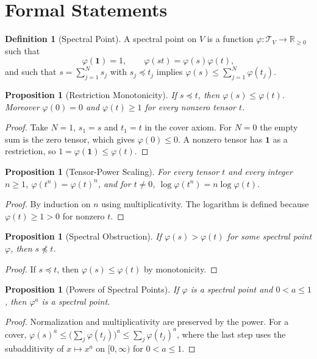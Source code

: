 \documentclass[11pt,letterpaper]{report}
\theoremstyle{plain}
\newtheorem{proposition}[theorem]{Proposition}
\theoremstyle{definition}
\newtheorem{definition}[theorem]{Definition}
\theoremstyle{remark}
\begin{document}
\section{Formal Statements}

\begin{definition}[Spectral Point]
A spectral point on $V$ is a function $\varphi:\mathcal T_V\to\mathbb R_{\ge0}$ such that
\[
\varphi(\mathbf 1)=1,\qquad\varphi(st)=\varphi(s)\varphi(t),
\]
and such that $s=\sum_{j=1}^{N}s_j$ with $s_j\preceq t_j$ implies $\varphi(s)\le\sum_{j=1}^{N}\varphi(t_j)$.
\end{definition}

\begin{proposition}[Restriction Monotonicity]
If $s\preceq t$, then $\varphi(s)\le\varphi(t)$. Moreover $\varphi(0)=0$ and $\varphi(t)\ge1$ for every nonzero tensor $t$.
\end{proposition}
\begin{proof}
Take $N=1$, $s_1=s$ and $t_1=t$ in the cover axiom. For $N=0$ the empty sum is the zero tensor, which gives $\varphi(0)\le0$. A nonzero tensor has $\mathbf 1$ as a restriction, so $1=\varphi(\mathbf 1)\le\varphi(t)$.
\end{proof}

\begin{proposition}[Tensor-Power Scaling]
For every tensor $t$ and every integer $n\ge1$, $\varphi(t^{n})=\varphi(t)^{n}$, and for $t\ne0$, $\log\varphi(t^{n})=n\log\varphi(t)$.
\end{proposition}
\begin{proof}
By induction on $n$ using multiplicativity. The logarithm is defined because $\varphi(t)\ge1>0$ for nonzero $t$.
\end{proof}

\begin{proposition}[Spectral Obstruction]\label{pr:specobs}
If $\varphi(s)>\varphi(t)$ for some spectral point $\varphi$, then $s\not\preceq t$.
\end{proposition}
\begin{proof}
If $s\preceq t$, then $\varphi(s)\le\varphi(t)$ by monotonicity.
\end{proof}

\begin{proposition}[Powers of Spectral Points]
If $\varphi$ is a spectral point and $0<a\le1$, then $\varphi^a$ is a spectral point.
\end{proposition}
\begin{proof}
Normalization and multiplicativity are preserved by the power. For a cover, $\varphi(s)^a\le\bigl(\sum_j\varphi(t_j)\bigr)^a\le\sum_j\varphi(t_j)^a$, where the last step uses the subadditivity of $x\mapsto x^a$ on $[0,\infty)$ for $0<a\le1$.
\end{proof}
\end{document}
